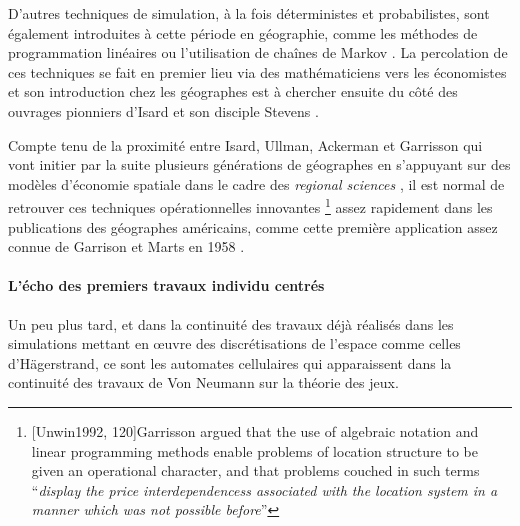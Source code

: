 D'autres techniques de simulation, à la fois déterministes et probabilistes, sont également introduites à cette période en géographie, comme les méthodes de programmation linéaires ou l'utilisation de chaînes de Markov \autocites{Marble1964, Clark1965, Whitelegg1976}. La percolation de ces techniques se fait en premier lieu via des mathématiciens vers les économistes \autocite{Samuelson1952} et son introduction chez les géographes est à chercher ensuite du côté des ouvrages pionniers d'Isard \autocites{Isard1958, Isard1960} et son disciple Stevens \autocite{Stevens1958}.

Compte tenu de la proximité entre Isard, Ullman, Ackerman et Garrisson \autocite{Barnes2004} qui vont initier par la suite plusieurs générations de géographes en s'appuyant sur des modèles d'économie spatiale dans le cadre des \textit{regional sciences} \autocite[120]{Unwin1992}, il est normal de retrouver ces techniques opérationnelles innovantes \footnote{ [Unwin1992, 120]{Garrisson argued that the use of algebraic notation and linear programming methods enable problems of location structure to be given an operational character, and that problems couched in such terms \enquote{\textit{display the price interdependencess associated with the location system in a manner which was not possible before}}}} assez rapidement dans les publications des géographes américains, comme cette première application assez connue de Garrison et Marts en 1958 \autocite{Garrison1958}.


\paragraph{L'écho des premiers travaux individu centrés}

Un peu plus tard, et dans la continuité des travaux déjà réalisés dans les simulations mettant en œuvre des discrétisations de l'espace comme celles d'Hägerstrand, ce sont les automates cellulaires qui apparaissent dans la continuité des travaux de Von Neumann sur la théorie des jeux. 

